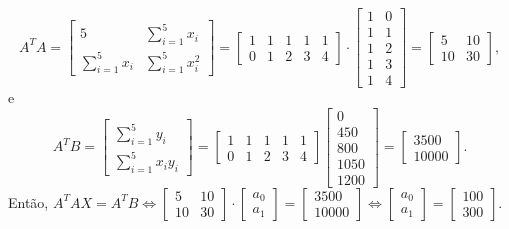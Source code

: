 \documentclass[12pt,a4paper]{article}
\begin{document}
\begin{ExerciseList}
\begin{enumerate}
\[
A^T A
= \begin{bmatrix}
 5                & \sum_{i=1}^5 x_i \\
\sum_{i=1}^5 x_i  & \sum_{i=1}^5 x_i^2
\end{bmatrix}
=\begin{bmatrix}
1 & 1 & 1 & 1 & 1 \\
0 & 1 & 2 & 3 & 4
\end{bmatrix}
\cdot
\begin{bmatrix}
  1 & 0 \\
  1 & 1 \\
  1 & 2 \\
  1 & 3 \\
  1 & 4
\end{bmatrix}
=\begin{bmatrix}
5 & 10 \\ 10 & 30
\end{bmatrix},
\]
e
\[
A^T B
= \begin{bmatrix}
 \sum_{i=1}^5 y_i \\
 \sum_{i=1}^5 x_i y_i
\end{bmatrix}
= \begin{bmatrix}
1 & 1 & 1 & 1 & 1 \\
0 & 1 & 2 & 3 & 4
\end{bmatrix}
\begin{bmatrix}
0 \\ 450 \\ 800 \\ 1050 \\ 1200
\end{bmatrix}
= \begin{bmatrix}
3500 \\ 10000
\end{bmatrix}.
\]
Então,
$
A^T A X = A^T B
\Leftrightarrow
\begin{bmatrix}
5 & 10 \\ 10 & 30
\end{bmatrix}
\cdot
\begin{bmatrix}
a_0\\
a_1
\end{bmatrix}
=
\begin{bmatrix}
3500 \\ 10000
\end{bmatrix}
\Leftrightarrow
\begin{bmatrix}
a_0\\
a_1
\end{bmatrix}
=
\begin{bmatrix}
100\\
300
\end{bmatrix}.
$


\end{enumerate}
\end{ExerciseList}
\end{document}

